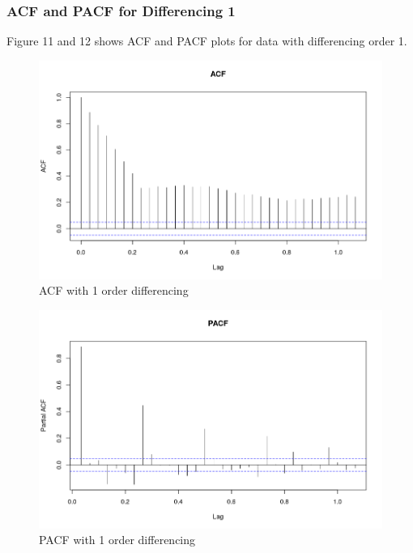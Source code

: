 \documentclass{article}
\begin{document}
\subsubsection{ACF and PACF for Differencing 1}

Figure 11 and 12 shows ACF and PACF plots for data with differencing order 1.

\begin{figure}[ht]
	\centering
	\includegraphics[scale=0.25]{images/ts_images/ACFWith1Differencing.png}
	\caption{ACF with 1 order differencing}
	\label{fig: ACF with 1 order differencing}
\end{figure}

\begin{figure}[ht]
	\centering
	\includegraphics[scale=0.25]{images/ts_images/PACFWith1Differencing.png}
	\caption{PACF with 1 order differencing}
	\label{fig: PACF with 1 order differencing}
\end{figure}
\end{document}

